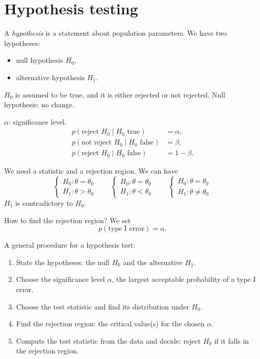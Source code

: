 \section{Hypothesis testing}
A \emph{hypothesis} is a statement about population parameters. We have two hypotheses:
\begin{itemize}[nosep]
\item null hypothesis $H_0$,
\item alternative hypothesis $H_1$.
\end{itemize}
$H_0$ is assumed to be true, and it is either rejected or not rejected. Null hypothesis: no change.

$\alpha$: significance level.
\begin{align*}
p(\text{reject } H_0 \mid H_0 \text{ true}) &= \alpha,\\
p(\text{not reject } H_0 \mid H_0 \text{ false}) &= \beta,\\
p(\text{reject } H_0 \mid H_0 \text{ false}) &= 1 - \beta.
\end{align*}

We need a statistic and a rejection region. We can have
\[
\begin{cases}
H_0: \theta = \theta_0\\
H_1: \theta > \theta_0
\end{cases}
\qquad
\begin{cases}
H_0: \theta = \theta_0\\
H_1: \theta < \theta_0
\end{cases}
\qquad
\begin{cases}
H_0: \theta = \theta_0\\
H_1: \theta \neq \theta_0
\end{cases}
\]
$H_1$ is contradictory to $H_0$.

How to find the rejection region? We set
\[
p(\text{type I error}) = \alpha.
\]

A general procedure for a hypothesis test:
\begin{enumerate}[nosep]
\item State the hypotheses: the null $H_0$ and the alternative $H_1$.
\item Choose the significance level $\alpha$, the largest acceptable probability of a type I error.
\item Choose the test statistic and find its distribution under $H_0$.
\item Find the rejection region: the critical value(s) for the chosen $\alpha$.
\item Compute the test statistic from the data and decide: reject $H_0$ if it falls in the rejection region.
\end{enumerate}

